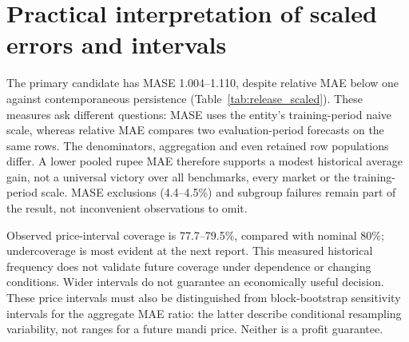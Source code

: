 \section{Practical interpretation of scaled errors and intervals}\label{sec:intervals}
The primary candidate has MASE 1.004--1.110, despite relative MAE below one against contemporaneous persistence (Table~\ref{tab:release_scaled}). These measures ask different questions: MASE uses the entity's training-period naive scale, whereas relative MAE compares two evaluation-period forecasts on the same rows. The denominators, aggregation and even retained row populations differ. A lower pooled rupee MAE therefore supports a modest historical average gain, not a universal victory over all benchmarks, every market or the training-period scale. MASE exclusions (4.4--4.5\%) and subgroup failures remain part of the result, not inconvenient observations to omit.

\begin{table}[!t]\centering\small\setlength{\tabcolsep}{4pt}
\caption{Primary study scaled errors and observed nominal 80\% price-interval performance. C/P denote candidate/persistence. Width is divided by origin price. MASE excludes unusable training scales.}\label{tab:release_scaled}

\end{table}

Observed price-interval coverage is 77.7--79.5\%, compared with nominal 80\%; undercoverage is most evident at the next report. This measured historical frequency does not validate future coverage under dependence or changing conditions. Wider intervals do not guarantee an economically useful decision. These price intervals must also be distinguished from block-bootstrap sensitivity intervals for the aggregate MAE ratio: the latter describe conditional resampling variability, not ranges for a future mandi price. Neither is a profit guarantee.
